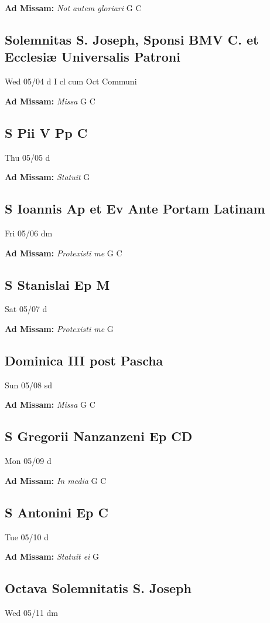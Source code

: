\documentclass[letterpaper, 10pt, twocolumn]{article}
\begin{document}
\textbf{Ad Missam:} \textit{Not autem gloriari} G C 

\subsection*{Solemnitas S. Joseph, Sponsi BMV C. et Ecclesiæ Universalis Patroni}Wed 05/04 d I cl cum Oct Communi

\textbf{Ad Missam:} \textit{Missa} G C 

\subsection*{S Pii V Pp C}Thu 05/05 d

\textbf{Ad Missam:} \textit{Statuit} G 

\subsection*{S Ioannis Ap et Ev Ante Portam Latinam}Fri 05/06 dm

\textbf{Ad Missam:} \textit{Protexisti me} G C 

\subsection*{S Stanislai Ep M}Sat 05/07 d

\textbf{Ad Missam:} \textit{Protexisti me} G 

\subsection*{Dominica III post Pascha}Sun 05/08 sd

\textbf{Ad Missam:} \textit{Missa} G C 

\subsection*{S Gregorii Nanzanzeni Ep CD}Mon 05/09 d

\textbf{Ad Missam:} \textit{In media} G C 

\subsection*{S Antonini Ep C}Tue 05/10 d

\textbf{Ad Missam:} \textit{Statuit ei} G 

\subsection*{Octava Solemnitatis S. Joseph}Wed 05/11 dm
\end{document}
